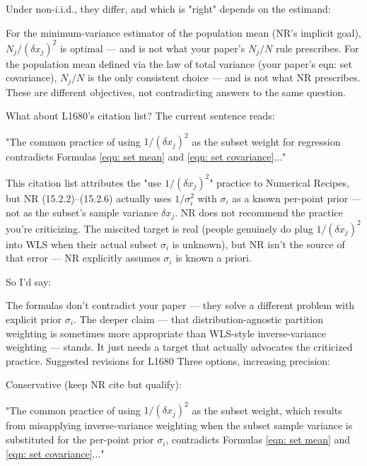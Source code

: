 \documentclass[twoside]{article}
\numberwithin{equation}{section}
\begin{document}
Under non-i.i.d., they differ, and which is "right" depends on the estimand:

For the minimum-variance estimator of the population mean (NR's implicit goal), $N_j/(\delta x_j)^2$ is optimal — and is not what your paper's $N_j/N$ rule prescribes.
For the population mean defined via the law of total variance (your paper's eqn: set covariance), $N_j/N$ is the only consistent choice — and is not what NR prescribes.
These are different objectives, not contradicting answers to the same question.

What about L1680's citation list?
The current sentence reads:

"The common practice of using $1/(\delta x_j)^2$ as the subset weight \cite{Statistical_Methods}\cite{Probability_Statistics}\cite{Numerical_Recipes} for regression contradicts Formulas \eqref{eqn: set mean} and \eqref{eqn: set covariance}..."

This citation list attributes the "use $1/(\delta x_j)^2$" practice to Numerical Recipes, but NR (15.2.2)–(15.2.6) actually uses $1/\sigma_i^2$ with $\sigma_i$ as a known per-point prior — not as the subset's sample variance $\delta x_j$. NR does not recommend the practice you're criticizing. The miscited target is real (people genuinely do plug $1/(\delta x_j)^2$ into WLS when their actual subset $\sigma_i$ is unknown), but NR isn't the source of that error — NR explicitly assumes $\sigma_i$ is known a priori.

So I'd say:

The formulas don't contradict your paper — they solve a different problem with explicit prior $\sigma_i$.
The deeper claim — that distribution-agnostic partition weighting is sometimes more appropriate than WLS-style inverse-variance weighting — stands. It just needs a target that actually advocates the criticized practice.
Suggested revisions for L1680
Three options, increasing precision:

Conservative (keep NR cite but qualify):

"The common practice of using $1/(\delta x_j)^2$ as the subset weight, which results from misapplying inverse-variance weighting \cite{Statistical_Methods}\cite{Probability_Statistics}\cite{Numerical_Recipes} when the subset sample variance is substituted for the per-point prior $\sigma_i$, contradicts Formulas \eqref{eqn: set mean} and \eqref{eqn: set covariance}..."
\end{document}
